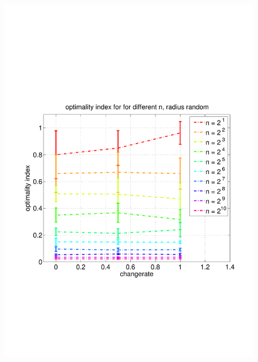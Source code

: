 \documentclass[11pt]{article}
\begin{document}
\begin{figure}
	\includegraphics[width=\linewidth]{../../code/data/2014_12_12_00_55_41/figure_12}
\end{figure}
\end{document}
